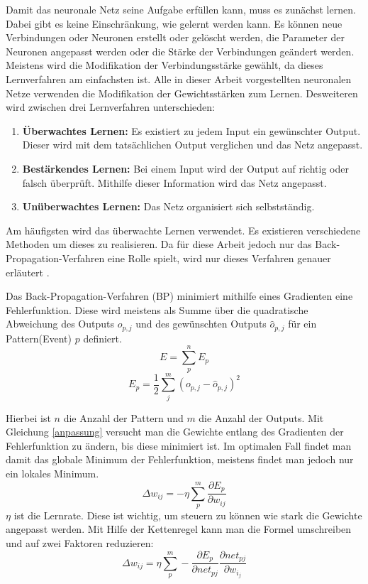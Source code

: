 \documentclass[12pt]{article}
\begin{document}
	Damit das neuronale Netz seine Aufgabe erfüllen kann, muss es zunächst lernen. Dabei gibt es keine Einschränkung, wie gelernt werden kann. Es können neue Verbindungen oder Neuronen erstellt oder gelöscht werden, die Parameter der Neuronen angepasst werden oder die Stärke der Verbindungen geändert werden. Meistens wird die Modifikation der Verbindungsstärke gewählt, da dieses Lernverfahren am einfachsten ist. Alle in dieser Arbeit vorgestellten neuronalen Netze verwenden die Modifikation der Gewichtsstärken zum Lernen. Desweiteren wird zwischen drei Lernverfahren unterschieden:
	\begin{enumerate}
		\item {\bf Überwachtes Lernen:} Es existiert zu jedem Input ein gewünschter Output. Dieser wird mit dem tatsächlichen Output verglichen und das Netz angepasst.
		\item {\bf Bestärkendes Lernen:} Bei einem Input wird der Output auf richtig oder falsch überprüft. Mithilfe dieser Information wird das Netz angepasst.
		\item {\bf Unüberwachtes Lernen:} Das Netz organisiert sich selbstständig.
	\end{enumerate}
	
	Am häufigsten wird das überwachte Lernen verwendet. Es existieren verschiedene Methoden um dieses zu realisieren. Da für diese Arbeit jedoch nur das Back-Propagation-Verfahren eine Rolle spielt, wird nur dieses Verfahren genauer erläutert \cite{PDP}.
	
	Das Back-Propagation-Verfahren (BP) minimiert mithilfe eines Gradienten eine Fehlerfunktion. Diese wird meistens als Summe über die quadratische Abweichung des Outputs $o_{p,j}$ und des gewünschten Outputs $\hat{o}_{p,j}$ für ein Pattern(Event) $p$ definiert.
\begin{equation} 
	E=\sum_p^n E_p 
\end{equation}
\begin{equation}
	\label{fehler}
	E_p=\frac{1}{2}\sum_j^m(o_{p,j}-\hat{o}_{p,j})^2
\end{equation}
	
Hierbei ist $n$ die Anzahl der Pattern und $m$ die Anzahl der Outputs.
Mit Gleichung \ref{anpassung} versucht man die Gewichte entlang des Gradienten der Fehlerfunktion zu ändern, bis diese minimiert ist. Im optimalen Fall findet man damit das globale Minimum der Fehlerfunktion, meistens findet man jedoch nur ein lokales Minimum. 
\begin{equation}
\label{anpassung}
\Delta w_{ij}=-\eta\sum_p^m \frac{\partial E_p}{\partial w_{ij}}
\end{equation}
$\eta$ ist die Lernrate. Diese ist wichtig, um steuern zu können wie stark die Gewichte angepasst werden. Mit Hilfe der Kettenregel kann man die Formel umschreiben und auf zwei Faktoren reduzieren:
\begin{equation}
\Delta w_{ij}=\eta\sum_p^m -\frac{\partial E_p}{\partial net_{pj}}\frac{\partial net_{pj}}{\partial w_{i_j}}
\end{equation}
\end{document}
